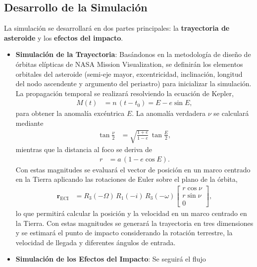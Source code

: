 \documentclass[conference]{IEEEtran}
\begin{document}
\subsection{Desarrollo de la Simulación}
La simulación se desarrollará en dos partes principales: la \textbf{trayectoria
	de asteroide} y los \textbf{efectos del impacto}.
\begin{itemize}
	\item \textbf{Simulación de la Trayectoria}: Basándonos en la metodología de
	      diseño de órbitas elípticas de NASA Mission Visualization,
	      se definirán los elementos orbitales del
	      asteroide (semi-eje mayor, excentricidad, inclinación, longitud del nodo
	      ascendente y argumento del periastro) para inicializar la simulación. La
	      propagación temporal se realizará resolviendo la ecuación de Kepler,
	      \begin{align}
		      M(t) & = n\,(t - t_0) = E - e \sin E, \label{eq:kepler}
	      \end{align}
	      para obtener la anomalía excéntrica $E$. La anomalía verdadera $\nu$ se
	      calculará mediante
	      \begin{align}
		      \tan\frac{\nu}{2} & = \sqrt{\frac{1 + e}{1 - e}}\,\tan\frac{E}{2},
	      \end{align}
	      mientras que la distancia al foco se deriva de
	      \begin{align}
		      r & = a\,(1 - e \cos E).
	      \end{align}
	      Con estas magnitudes se evaluará el vector de posición en un marco
	      centrado en la Tierra aplicando las rotaciones de Euler sobre el plano de
	      la órbita,
	      \begin{align}
		      \mathbf{r}_{\text{ECI}} & =
		      R_3(-\Omega)\,R_1(-i)\,R_3(-\omega)
		      \begin{bmatrix}
			      r \cos \nu \\
			      r \sin \nu \\
			      0
		      \end{bmatrix},
	      \end{align}
	      lo que permitirá calcular la posición y la velocidad en un marco centrado
	      en la Tierra. Con estas magnitudes se generará la trayectoria en tres
	      dimensiones y se estimará el punto de impacto considerando la rotación
	      terrestre, la velocidad de llegada y diferentes ángulos de entrada.
	      \cite{nasaEllipticalOrbit}
	\item \textbf{Simulación de los Efectos del Impacto}: Se seguirá el flujo

\end{itemize}
\end{document}
